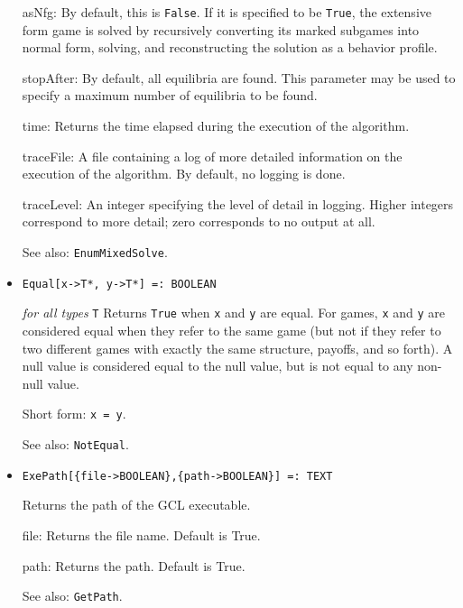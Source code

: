 \begin{itemize}
{\it for} {\tt T = FLOAT, RATIONAL}
\bd
Returns all pure strategy Nash equilibria of a game using the given
\verb+support+.  The behavior
of the algorithm may be modified by the following optional parameters:
\bd
\item
[asNfg:] By default, this is \verb+False+.  If it is specified to be
\verb+True+, the extensive form game is solved by recursively converting
its marked subgames into normal form, solving, and reconstructing the
solution as a behavior profile.
\item
[stopAfter:] By default, all equilibria are found.  This parameter may
be used to specify a maximum number of equilibria to be found.
\item
[time:] Returns the time elapsed during the execution
of the algorithm.
\item
[traceFile:] A file containing a log of more detailed information on the
execution of the algorithm.  By default, no logging is done.
\item
[traceLevel:] An integer specifying the level of detail in logging.  Higher
integers correspond to more detail; zero corresponds to no output at all.
\ed
\item
[See also:] \verb+EnumMixedSolve+.
\ed

\item{}
\protect \large \begin{verbatim}
Equal[x->T*, y->T*] =: BOOLEAN
\end{verbatim}\normalsize

{\it for all types} {\tt T}
\bd
Returns \verb+True+ when \verb+x+ and \verb+y+ are equal.  For games,
\verb+x+ and \verb+y+ are considered equal when they refer to the same
game (but not if they refer to two different games with exactly the
same structure, payoffs, and so forth).  A null value is considered equal
to the null value, but is not equal to any non-null value.
\item
[Short form:] \verb+x = y+.
\item
[See also:] \verb+NotEqual+.
\ed

\item{}
\protect \large \begin{verbatim}
ExePath[{file->BOOLEAN},{path->BOOLEAN}] =: TEXT 
\end{verbatim} \normalsize

\bd
Returns the path of the GCL executable. 
\bd
\item [file:] Returns the file name.  Default is True.  
\item [path:] Returns the path.  Default is True. 
\ed
\item [See also:] \verb+GetPath+.
\ed


\end{itemize}
